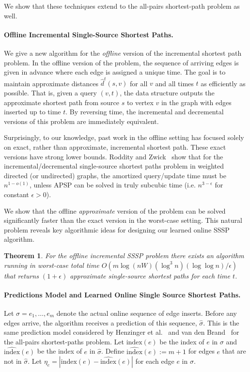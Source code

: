 \documentclass[11pt]{article}
\newtheorem{theorem}{Theorem}
\newcommand{\ind}{\text{index}}
\begin{document}
We show that these techniques extend to the all-pairs shortest-path problem as well. 

\paragraph{Offline Incremental Single-Source Shortest Paths.}  We give a new algorithm for the \emph{offline} version of the incremental shortest path problem. In the offline version of the problem, the sequence of arriving edges is given in advance where each edge is assigned a unique time.  The goal is to maintain approximate distances $\hat{d}^t(s,v)$ for all $v$ and all times $t$ as efficiently as possible.  That is, given a query $(v,t)$, the data
structure outputs the approximate shortest path from source $s$ to
vertex $v$ in the graph with edges inserted up to time $t$.
By reversing time, the incremental and decremental versions of this problem are immediately equivalent.

Surprisingly, to our knowledge, past work in the offline setting has focused solely on exact, rather than approximate, incremental shortest path.  These exact versions have strong lower bounds. Roddity and Zwick~\cite{RodittyZ11} show that for the incremental/decremental single-source shortest paths problem in weighted directed (or undirected) graphs, the amortized query/update time must be $n^{1-o(1)}$, unless APSP can be solved in truly subcubic time (i.e. $n^{3-\epsilon}$ for constant $\epsilon>0$). 

We show that the offline \emph{approximate} version of the problem can be solved significantly faster than the exact version in the worst-case setting.  This natural problem reveals key algorithmic ideas for designing our learned online SSSP algorithm.

\begin{theorem}
\label{thm:offline-approx}
For the offline incremental SSSP problem there exists an algorithm running in worst-case total time $O(m \log (nW)  (\log^3 n)(\log \log n)/\epsilon)$ that returns $(1+\epsilon)$ approximate single-source shortest paths for each time $t$.
\end{theorem}


\paragraph{Predictions Model and Learned Online Single Source Shortest Paths.} 
Let $\sigma = e_1, \ldots, e_m$ denote the actual online sequence of edge inserts.  Before any edges arrive, the algorithm receives a prediction of this sequence, $\hat{\sigma}$.  This is the same prediction model considered by Henzinger et al.~\cite{HenzingerSSY24} and van den Brand~\cite{BrandFNP24} for the all-pairs shortest-paths problem. Let $\ind(e)$ be the index of $e$ in $\sigma$ and $\widehat{\ind}(e)$ be the index of $e$ in $\hat{\sigma}$.
Define $\widehat{\ind}(e):=m+1$ for edges $e$ that are not in $\hat{\sigma}$. 
Let $\eta_e = |\ind(e) - \widehat{\ind}(e)|$ for each edge $e$ in $\sigma$.
\end{document}
